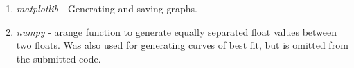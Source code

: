 \documentclass[12pt, twoside]{article}
\begin{document}
\begin{enumerate}
    \item
        \textit{matplotlib} - Generating and saving graphs.
    \item
        \textit{numpy} - arange function to generate equally separated float values between two floats.
        Was also used for generating curves of best fit, but is omitted from the submitted code.
\end{enumerate}
 
\end{document}
